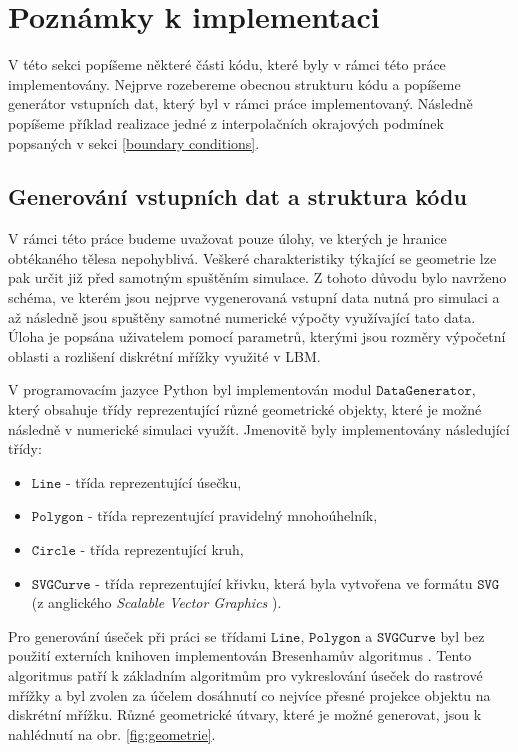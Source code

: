 \section{Poznámky k implementaci}\label{implementace}
V této sekci popíšeme některé části kódu, které byly v rámci této práce implementovány. Nejprve rozebereme obecnou strukturu kódu a popíšeme generátor vstupních dat, který byl v rámci práce implementovaný. Následně popíšeme příklad realizace jedné z interpolačních okrajových podmínek popsaných v sekci \ref{boundary conditions}.
\subsection{Generování vstupních dat a struktura kódu}\label{data}
V rámci této práce budeme uvažovat pouze úlohy, ve kterých je hranice obtékaného tělesa nepohyblivá. Veškeré charakteristiky týkající se geometrie lze pak určit již před samotným spuštěním simulace. Z tohoto důvodu bylo navrženo schéma, ve kterém jsou nejprve vygenerovaná vstupní data nutná pro simulaci a až následně jsou spuštěny samotné numerické výpočty využívající tato data. Úloha je popsána uživatelem pomocí parametrů, kterými jsou rozměry výpočetní oblasti a rozlišení diskrétní mřížky využité v LBM.

V programovacím jazyce Python byl implementován modul $\mathtt{DataGenerator} $, který obsahuje třídy reprezentující různé geometrické objekty, které je možné následně v numerické simulaci využít. Jmenovitě byly implementovány následující třídy:
\begin{itemize}
	\item $\mathtt{Line} $ - třída reprezentující úsečku,
	\item $\mathtt{Polygon} $ - třída reprezentující pravidelný mnohoúhelník,
	\item $\mathtt{Circle} $ - třída reprezentující kruh,
	\item $\mathtt{SVGCurve} $ - třída reprezentující křivku, která byla vytvořena ve formátu $\mathtt{SVG} $ (z anglického \textit{Scalable Vector Graphics} \cite{Eisenberg2002}).
\end{itemize}
Pro generování úseček při práci se třídami $\mathtt{Line} $, $\mathtt{Polygon} $ a $\mathtt{SVGCurve} $ byl bez použití externích knihoven implementován Bresenhamův algoritmus \cite{Bresenham}. Tento algoritmus patří k základním algoritmům pro vykreslování úseček do rastrové mřížky a byl zvolen za účelem dosáhnutí co nejvíce přesné projekce objektu na diskrétní mřížku. Různé geometrické útvary, které je možné generovat, jsou k nahlédnutí na obr. \ref{fig:geometrie}.

